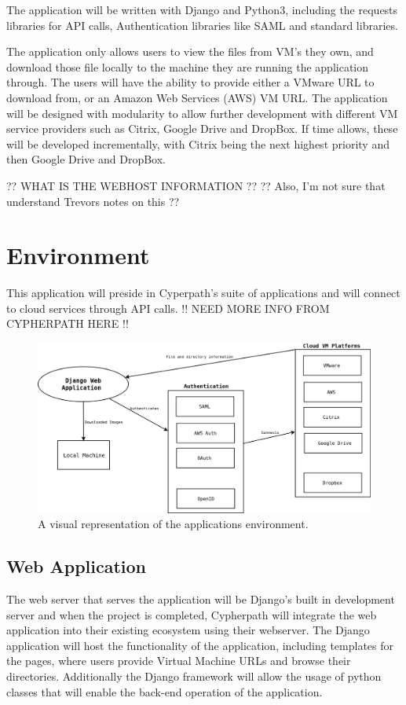 \documentclass{article}
\begin{document}
    The application will be written with Django and Python3, including the requests libraries for API calls, Authentication libraries like SAML
    and standard libraries.

    The application only allows users to view the files from VM's they own, and download those file locally to the machine they 
    are running the application through. The users will have the ability to provide either a VMware URL to download from, or an
    Amazon Web Services (AWS) VM URL. The application will be designed with modularity to allow further development with different 
	VM service providers such as Citrix, Google Drive and DropBox. If time allows, these will be developed incrementally, with 
	Citrix being the next highest priority and then Google Drive and DropBox.

	\large ?? WHAT IS THE WEBHOST INFORMATION ?? 
	?? Also, I'm not sure that understand Trevors notes on this ??
	
    \section{Environment}
	\large This application will preside in Cyperpath's suite of applications and will connect to cloud services through API calls. 
    !! NEED MORE INFO FROM CYPHERPATH HERE !!
	
    \begin{figure}[h]
    \includegraphics[scale=.4]{downloader_env}
        \caption{A visual representation of the applications environment.}
    \end{figure}


        \subsection{Web Application}
        The web server that serves the application will be Django's built in development server and when the project is completed, Cypherpath will integrate
        the web application into their existing ecosystem using their webserver. The Django application will host the functionality of the application, including templates for the 
        pages, where users provide Virtual Machine URLs and browse their directories. Additionally the Django framework will allow the usage of python classes that will enable the 
        back-end operation of the application.
\end{document}
